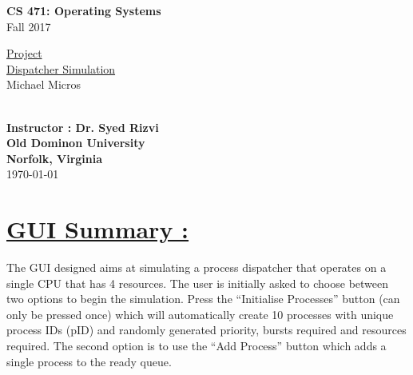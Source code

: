 \documentclass{article}
\begin{document}

\begin{titlepage}

\vspace*{45 pt}
\begin{center}
\Huge{\bf CS 471: Operating Systems}\\
\huge{Fall 2017\\}

\vspace{60 pt}
\Huge\underline {Project}\\
\vspace{10 pt}
\huge\underline {Dispatcher Simulation}\\

\vspace{30 pt}
\Huge{Michael Micros}\\\

{\Large \bf {Instructor : Dr. Syed Rizvi}}\\

\vspace{180 pt}
{\huge \bf {Old Dominon University}}\\
{\huge \bf {Norfolk, Virginia}}\\

\vspace{10 pt}
\today

\end{center}
\end{titlepage}




\section*{{\underline{\huge {GUI Summary :}}  }}
The GUI designed aims at simulating a process dispatcher that operates on a single CPU that has 4 resources. The user is initially asked to choose between two options to begin the simulation. Press the ``Initialise Processes'' button (can only be pressed once) which will automatically create 10 processes with unique process IDs (pID) and randomly generated priority, bursts required and resources required. The second option is to use the ``Add Process'' button which adds a single process to the ready queue.
\end{document}
